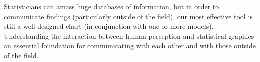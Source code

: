 \documentclass[11pt,letterpaper,sans,unicode]{moderncv}        %
\begin{document}
Statisticians can amass huge databases of information, but in order to communicate findings (particularly outside of the field), our most effective tool is still a well-designed chart (in conjunction with one or more models). Understanding the interaction between human perception and statistical graphics an essential foundation for communicating with each other and with those outside of the field. 
\end{document}
